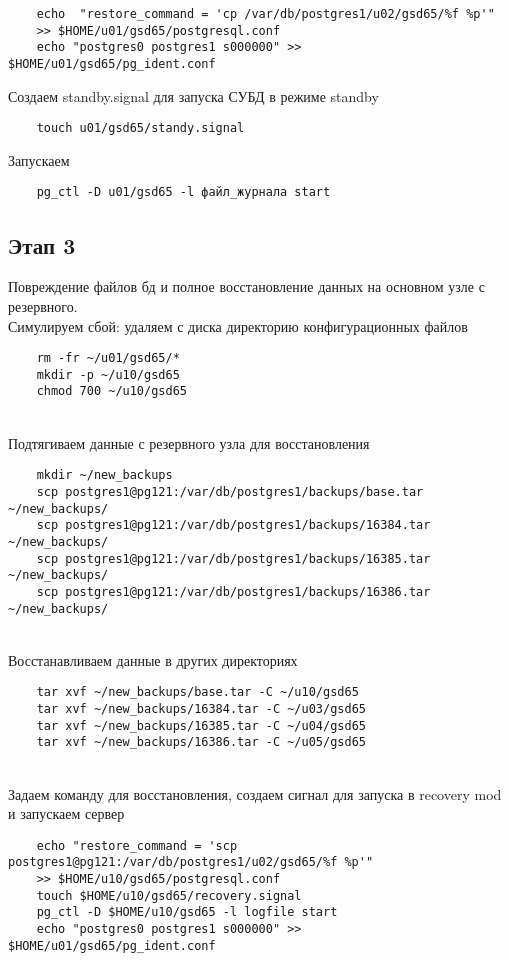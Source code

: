 \documentclass{article}
\begin{document}
\begin{verbatim}
    echo  "restore_command = 'cp /var/db/postgres1/u02/gsd65/%f %p'" 
    >> $HOME/u01/gsd65/postgresql.conf
    echo "postgres0 postgres1 s000000" >> $HOME/u01/gsd65/pg_ident.conf 
\end{verbatim}
Создаем standby.signal для запуска СУБД в режиме standby
\begin{verbatim}
    touch u01/gsd65/standy.signal
\end{verbatim}
Запускаем
\begin{verbatim}
    pg_ctl -D u01/gsd65 -l файл_журнала start
\end{verbatim}

\subsection{Этап 3}
Повреждение файлов бд и полное восстановление данных на основном узле с резервного. \\
Симулируем сбой: удаляем с диска директорию конфигурационных файлов
\begin{verbatim}
    rm -fr ~/u01/gsd65/*
    mkdir -p ~/u10/gsd65
    chmod 700 ~/u10/gsd65
\end{verbatim} \\
Подтягиваем данные с резервного узла для восстановления
\begin{verbatim}
    mkdir ~/new_backups
    scp postgres1@pg121:/var/db/postgres1/backups/base.tar ~/new_backups/
    scp postgres1@pg121:/var/db/postgres1/backups/16384.tar ~/new_backups/
    scp postgres1@pg121:/var/db/postgres1/backups/16385.tar ~/new_backups/
    scp postgres1@pg121:/var/db/postgres1/backups/16386.tar ~/new_backups/
\end{verbatim} \\
Восстанавливаем данные в других директориях
\begin{verbatim}
    tar xvf ~/new_backups/base.tar -C ~/u10/gsd65
    tar xvf ~/new_backups/16384.tar -C ~/u03/gsd65
    tar xvf ~/new_backups/16385.tar -C ~/u04/gsd65
    tar xvf ~/new_backups/16386.tar -C ~/u05/gsd65
\end{verbatim} \\
Задаем команду для восстановления, создаем сигнал для запуска в recovery mod и запускаем сервер
\begin{verbatim}
    echo "restore_command = 'scp postgres1@pg121:/var/db/postgres1/u02/gsd65/%f %p'"
    >> $HOME/u10/gsd65/postgresql.conf
    touch $HOME/u10/gsd65/recovery.signal
    pg_ctl -D $HOME/u10/gsd65 -l logfile start
    echo "postgres0 postgres1 s000000" >> $HOME/u01/gsd65/pg_ident.conf 
\end{verbatim}
\end{document}
